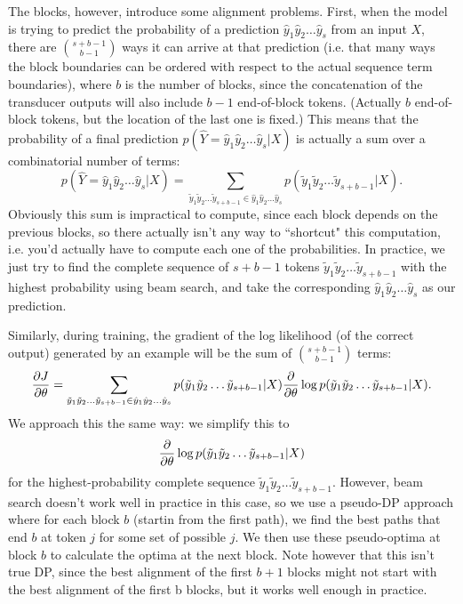 The blocks, however, introduce some alignment problems. First, when the model is trying to predict the probability of a prediction $\hat{y}_1\hat{y}_2\dots\hat{y}_s$ from an input $X$, there are $\binom{s + b - 1}{b - 1}$ ways it can arrive at that prediction (i.e. that many ways the block boundaries can be ordered with respect to the actual sequence term boundaries), where $b$ is the number of blocks, since the concatenation of the transducer outputs will also include $b-1$ end-of-block tokens. (Actually $b$ end-of-block tokens, but the location of the last one is fixed.) This means that the probability of a final prediction $p(\hat{Y} = \hat{y}_1\hat{y}_2\dots\hat{y}_s | X)$ is actually a sum over a combinatorial number of terms:
$$p(\hat{Y} = \hat{y}_1\hat{y}_2\dots\hat{y}_s | X) = \sum_{\tilde{y}_1\tilde{y}_2\dots\tilde{y}_{s + b - 1} \in \hat{y}_1\hat{y}_2\dots\hat{y}_s} p(\tilde{y}_1\tilde{y}_2\dots\tilde{y}_{s + b - 1} | X).$$
Obviously this sum is impractical to compute, since each block depends on the previous blocks, so there actually isn't any way to ``shortcut" this computation, i.e. you'd actually have to compute each one of the probabilities. In practice, we just try to find the complete sequence of $s + b - 1$ tokens $\tilde{y}_1\tilde{y}_2\dots\tilde{y}_{s+b-1}$ with the highest probability using beam search, and take the corresponding $\hat{y}_1\hat{y}_2\dots\hat{y}_s$ as our prediction.

Similarly, during training, the gradient of the log likelihood (of the correct output) generated by an example will be the sum of $\binom{s+b-1}{b-1}$ terms:
$$\frac{\partial J}{\partial \theta} = \sum_{\tilde{y}_1\tilde{y}_2\dots\tilde{y}_{s + b - 1} \in \hat{y}_1\hat{y}_2\dots\hat{y}_s} p(\tilde{y}_1\tilde{y}_2\dots\tilde{y}_{s + b - 1} | X) \frac{\partial }{\partial \theta} \log p(\tilde{y}_1\tilde{y}_2\dots\tilde{y}_{s + b - 1} | X).$$
We approach this the same way: we simplify this to
$$\frac{\partial }{\partial \theta}\log p(\tilde{y}_1\tilde{y}_2\dots\tilde{y}_{s + b - 1} | X)$$
for the highest-probability complete sequence $\tilde{y}_1\tilde{y}_2\dots\tilde{y}_{s+b-1}$. However, beam search doesn't work well in practice in this case, so we use a pseudo-DP approach where for each block $b$ (startin from the first path), we find the best paths that end $b$ at token $j$ for some set of possible $j$. We then use these pseudo-optima at block $b$ to calculate the optima at the next block. Note however that this isn't true DP, since the best alignment of the first $b+1$ blocks might not start with the best alignment of the first b blocks, but it works well enough in practice.

